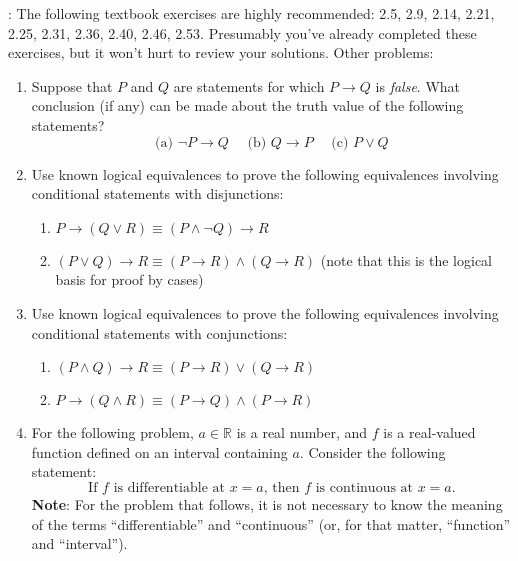 \documentclass[letterpaper,12pt]{article}
\newcommand{\R}{\mathbb{R}}
\begin{document}
\bigskip

: The following textbook exercises are highly recommended: 2.5, 2.9, 2.14, 2.21, 2.25, 2.31, 2.36, 2.40, 2.46, 2.53. Presumably you've already completed these exercises, but it won't hurt to review your solutions. Other problems:
\begin{enumerate}
 \item Suppose that $P$ and $Q$ are statements for which $P\to Q$ is {\em false}. What conclusion (if any) can be made about the truth value of the following statements?
\[
 \text{(a) }\neg P\to Q \quad \text{ (b) } Q\to P \quad \text{ (c) } P\vee Q
\]
 \item Use known logical equivalences to prove the following equivalences involving conditional statements with disjunctions:
\begin{enumerate}
 \item $P\to (Q\vee R)\equiv (P\wedge \neg Q)\to R$
 \item $(P\vee Q)\to R \equiv (P\to R)\wedge (Q\to R)$ (note that this is the logical basis for proof by cases)
\end{enumerate}
 \item Use known logical equivalences to prove the following equivalences involving conditional statements with conjunctions:
\begin{enumerate}
 \item $(P\wedge Q)\to R \equiv (P\to R)\vee (Q\to R)$
 \item $P\to (Q\wedge R) \equiv (P\to Q)\wedge (P\to R)$
\end{enumerate}
 \item For the following problem, $a\in \R$ is a real number, and $f$ is a real-valued function defined on an interval containing $a$. Consider the following statement:
\[
 \text{If $f$ is differentiable at $x=a$, then $f$ is continuous at $x=a$.}
\]
{\bf Note}: For the problem that follows, it is not necessary to know the meaning of the terms ``differentiable'' and ``continuous'' (or, for that matter, ``function'' and ``interval'').


\end{enumerate}
\end{document}
